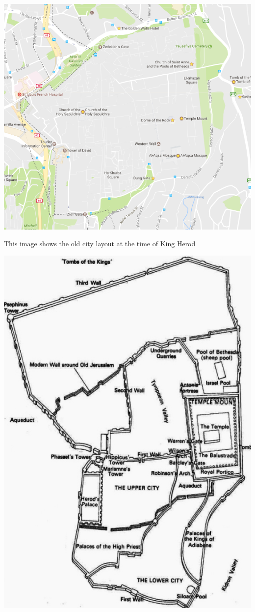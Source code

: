 \documentclass[letterpaper]{report}
\begin{document}
\includegraphics[width=\textwidth]{OldJerusalem}

\href{http://www.jesus-story.net/maps_jesus.htm}{
	This image shows the old city layout at the time of King Herod}

\includegraphics[height=0.9\textheight]{JerusalemAsItWas}
\end{document}
